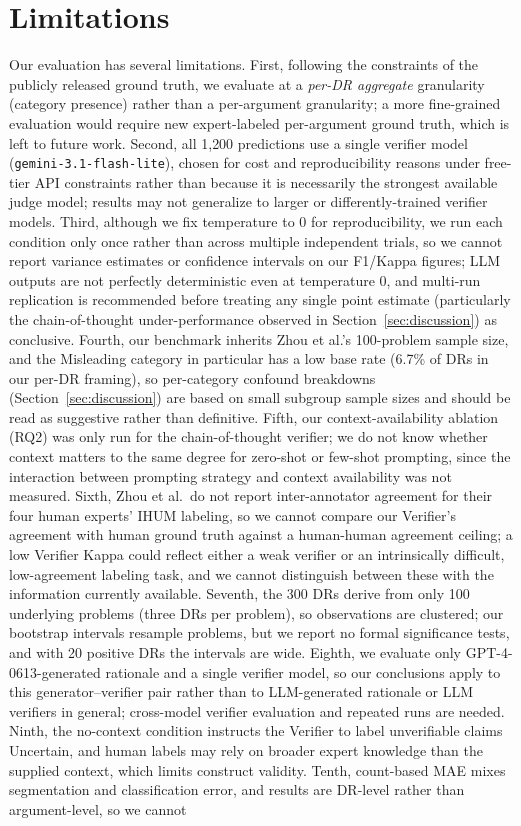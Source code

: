 \documentclass[runningheads]{llncs}
\begin{document}
\section{Limitations}
\label{sec:limitations}

Our evaluation has several limitations. First, following the constraints of the publicly released ground truth, we evaluate at a \emph{per-DR aggregate} granularity (category presence) rather than a per-argument granularity; a more fine-grained evaluation would require new expert-labeled per-argument ground truth, which is left to future work. Second, all 1{,}200 predictions use a single verifier model (\texttt{gemini-3.1-flash-lite}), chosen for cost and reproducibility reasons under free-tier API constraints rather than because it is necessarily the strongest available judge model; results may not generalize to larger or differently-trained verifier models. Third, although we fix temperature to 0 for reproducibility, we run each condition only once rather than across multiple independent trials, so we cannot report variance estimates or confidence intervals on our F1/Kappa figures; LLM outputs are not perfectly deterministic even at temperature 0, and multi-run replication is recommended before treating any single point estimate (particularly the chain-of-thought under-performance observed in Section~\ref{sec:discussion}) as conclusive. Fourth, our benchmark inherits Zhou et al.'s 100-problem sample size, and the Misleading category in particular has a low base rate (6.7\% of DRs in our per-DR framing), so per-category confound breakdowns (Section~\ref{sec:discussion}) are based on small subgroup sample sizes and should be read as suggestive rather than definitive. Fifth, our context-availability ablation (RQ2) was only run for the chain-of-thought verifier; we do not know whether context matters to the same degree for zero-shot or few-shot prompting, since the interaction between prompting strategy and context availability was not measured. Sixth, Zhou et al.\ do not report inter-annotator agreement for their four human experts' IHUM labeling, so we cannot compare our Verifier's agreement with human ground truth against a human-human agreement ceiling; a low Verifier Kappa could reflect either a weak verifier or an intrinsically difficult, low-agreement labeling task, and we cannot distinguish between these with the information currently available. Seventh, the 300 DRs derive from only 100 underlying problems (three DRs per problem), so observations are clustered; our bootstrap intervals resample problems, but we report no formal significance tests, and with 20 positive DRs the intervals are wide. Eighth, we evaluate only GPT-4-0613-generated rationale and a single verifier model, so our conclusions apply to this generator--verifier pair rather than to LLM-generated rationale or LLM verifiers in general; cross-model verifier evaluation and repeated runs are needed. Ninth, the no-context condition instructs the Verifier to label unverifiable claims Uncertain, and human labels may rely on broader expert knowledge than the supplied context, which limits construct validity. Tenth, count-based MAE mixes segmentation and classification error, and results are DR-level rather than argument-level, so we cannot 
\end{document}
